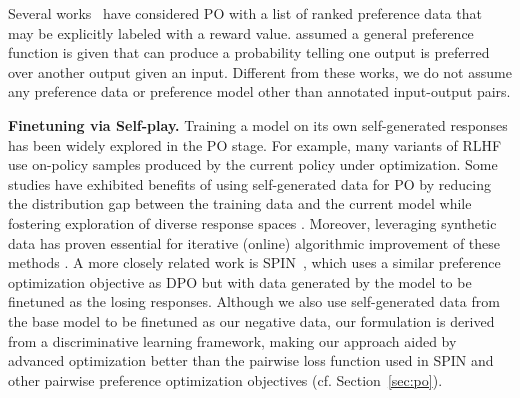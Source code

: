 Several works~\cite{chen2024noise,yuan2023rrhf,10.1609/aaai.v38i17.29865} have considered PO with a list of ranked preference data that may be explicitly labeled with a reward value.  \citet{rosset2024direct} assumed a general preference function is given that can produce a probability telling one output is preferred over another output given an input. Different from these works, we do not assume any preference data or preference model other than annotated input-output pairs. %

{\bf Finetuning via Self-play.} Training a model on its own self-generated responses has been widely explored in the PO stage. For example, many variants of RLHF \citep{christiano2017deep,ziegler2019fine,learn2020summ,ouyang2022training, bai2022training, li2023remax, chan2024dense, ji2024self} use on-policy samples produced by the current policy under optimization. Some studies have exhibited benefits of using self-generated data for PO by reducing the distribution gap between the training data and the current model while fostering exploration of diverse response spaces \citep{xu2024is,tajwar2024preference, tang2024understanding}. Moreover, leveraging synthetic data has proven essential for iterative (online) algorithmic improvement of these methods \citep{xu2023some, guo2024direct, yuanself, chen2024bootstrapping, dong2024rlhf}. A more closely related work is SPIN~\citep{wu2024self}, which uses a similar preference optimization objective as DPO but with data generated by the model to be finetuned as the losing responses. Although we also use self-generated data from the base model to be finetuned as our negative data, our formulation is derived from a discriminative learning framework, making our approach aided by advanced optimization better than the pairwise loss function used in SPIN and other pairwise preference optimization objectives (cf. Section~\ref{sec:po}). 

